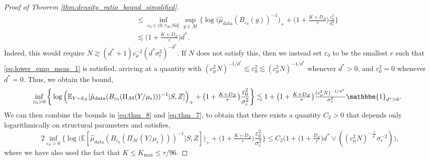 \documentclass[10pt]{article}
\theoremstyle{plain}
\theoremstyle{definition}
\theoremstyle{remark}
\newcommand{\M}{{\mathcal{M}}}
\newcommand{\E}{\mathbb{E}}
\begin{document}
\begin{proof}[Proof of Theorem \ref{thm:density_ratio_bound_simplified}]
\begin{align}
    & \qquad \qquad \leq \inf_{\varepsilon_0 \in (0, \tau_\M/64]} \sup_{y \in \M} \bigg \{ \log \big ( \hat{\mu}_{\operatorname{data}}(B_{\varepsilon_0}(y))^{-1} \big )_+ + \big ( 1 + \tfrac{K + D_Z}{\tau} \big ) \frac{\varepsilon_0^2}{\sigma_\epsilon^2} \bigg \}\nonumber\\
    & \qquad \qquad \lesssim \Big ( 1 + \tfrac{K + D_Z}{\tau} \Big ) d^*.\label{eq:thm_8}
\end{align}
Indeed, this would require \(N \gtrsim (d^* + 1) c_\mu^{-2} (d^* \sigma_\epsilon^2)^{-d^*}\). If \(N\) does not satisfy this, then we instead set \(\varepsilon_0\) to be the smallest \(r\) such that \eqref{eq:lower_emp_meas_1} is satisfied, arriving at a quantity with \((c_\mu^2 N)^{-1/d^*} \lesssim \varepsilon_0^2 \lesssim (c_\mu^2 N)^{-1/d^*}\) whenever \(d^* > 0\), and \(\varepsilon^2_0 = 0\) whenever \(d^* = 0\). Thus, we obtain the bound,
\begin{align}
    &\inf_{\varepsilon_0 > 0} \bigg \{ \log \Big ( \E_{Y \sim k_Z} [ \hat{\mu}_{\operatorname{data}}(B_{\varepsilon_0}(\Pi_\M(Y/\mu_\epsilon)))^{-1} | S, Z ] \Big )_+ + \big ( 1 + \tfrac{K + D_Z}{\tau} \big ) \frac{\varepsilon_0^2}{\sigma_\epsilon^2} \bigg \} \lesssim 1 + \big ( 1 + \tfrac{K + D_Z}{\tau} \big ) \tfrac{(c_\mu^2 N)^{-1/d^*}}{\sigma_\epsilon^2} \mathbbm{1}_{d^* > 0}.\label{eq:thm_7}
\end{align}
We can then combine the bounds in \eqref{eq:thm_8} and \eqref{eq:thm_7}, to obtain that there exists a quantity \(C_2 > 0\) that depends only logarithmically on structural parameters and satisfies,
\begin{equation}\label{eq:thm_9}
    2\inf_{\varepsilon_0 > 0} \bigg \{ \log \Big ( \E[ \hat{\mu}_{\operatorname{data}}(B_{\varepsilon_0}(\Pi_\M(Y/\mu_\epsilon)))^{-1} | S, Z ] \Big )_+ + \big ( 1 + \tfrac{K + D_Z}{\tau} \big ) \frac{\varepsilon_0^2}{\sigma_\epsilon^2} \bigg \} \leq C_2 \bigg ( 1 + \Big ( 1 + \tfrac{D_Z}{\tau} \Big ) d^* \vee ((c_\mu^2 N)^{-\frac{1}{d^*}} \sigma_\epsilon^{-2}) \bigg ),
\end{equation}
where we have also used the fact that \(K \leq K_{\max} \leq \tau/96\).


\end{proof}
\end{document}
